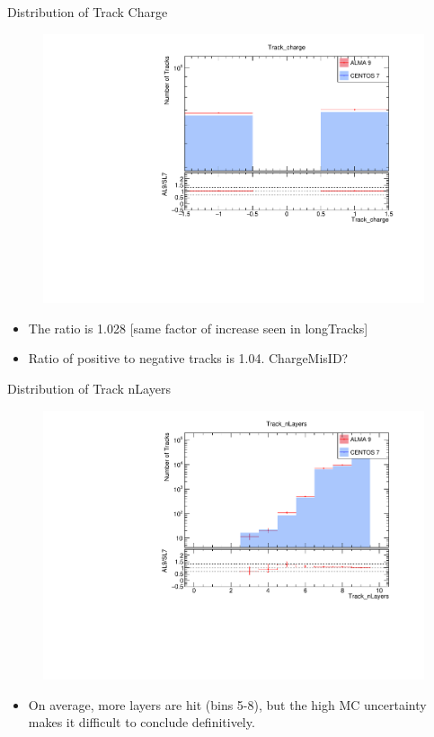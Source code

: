 \begin{frame}{Distribution of Track Charge}
    \vspace{-0.3cm}
    \begin{figure}
        \includegraphics[width=0.9\linewidth]{./output/Track_charge.pdf}
    \end{figure}
    \vspace{-0.6cm}
        \begin{itemize}
            \item The ratio is 1.028 [same factor of increase seen in longTracks]
            \item Ratio of positive to negative tracks is 1.04. ChargeMisID?
        \end{itemize}
\end{frame}

\begin{frame}{Distribution of Track nLayers}
    \vspace{-0.3cm}
    \begin{figure}
        \includegraphics[width=0.95\linewidth]{./output/Track_nLayers.pdf}
    \end{figure}
    \vspace{-0.6cm}
    \begin{itemize}
        \item On average, more layers are hit (bins 5-8), but the high MC uncertainty makes it difficult to conclude definitively.
    \end{itemize}
\end{frame}

